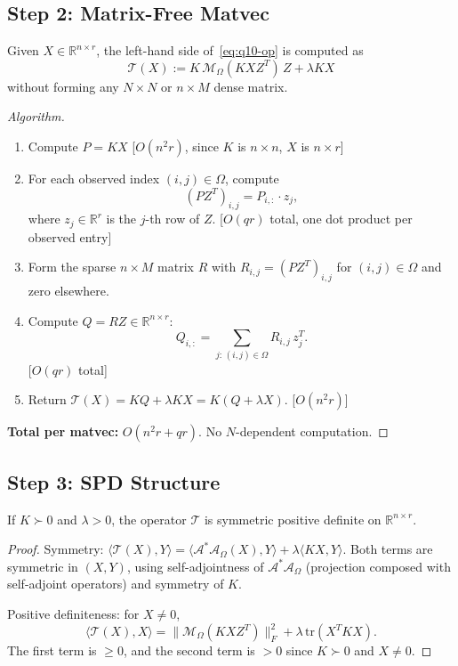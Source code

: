 \subsection*{Step 2: Matrix-Free Matvec}

\begin{proposition}\label{prop:q10-matvec}
Given $X\in\mathbb R^{n\times r}$, the left-hand side of~\eqref{eq:q10-op} is computed as
\[
\mathcal T(X) := K\,\mathcal M_\Omega(K X Z^T)\,Z + \lambda K X
\]
without forming any $N\times N$ or $n\times M$ dense matrix.
\end{proposition}

\begin{proof}[Algorithm]
\leavevmode
\begin{enumerate}
\item Compute $P = KX$ \hfill [$O(n^2 r)$, since $K$ is $n\times n$, $X$ is $n\times r$]
\item For each observed index $(i,j)\in\Omega$, compute
\[
(PZ^T)_{i,j} = P_{i,:}\cdot z_j,
\]
where $z_j\in\mathbb R^r$ is the $j$-th row of $Z$.
\hfill [$O(qr)$ total, one dot product per observed entry]
\item Form the sparse $n\times M$ matrix $R$ with $R_{i,j}=(PZ^T)_{i,j}$ for $(i,j)\in\Omega$ and zero elsewhere.
\item Compute $Q = RZ\in\mathbb R^{n\times r}$:
\[
Q_{i,:} = \sum_{j:\,(i,j)\in\Omega} R_{i,j}\,z_j^T.
\]
\hfill [$O(qr)$ total]
\item Return $\mathcal T(X) = KQ + \lambda KX = K(Q + \lambda X)$.
\hfill [$O(n^2 r)$]
\end{enumerate}
\textbf{Total per matvec:} $O(n^2 r + qr)$. No $N$-dependent computation.
\end{proof}

\subsection*{Step 3: SPD Structure}

\begin{proposition}\label{prop:q10-spd}
If $K\succ 0$ and $\lambda>0$, the operator $\mathcal T$ is symmetric positive definite on $\mathbb R^{n\times r}$.
\end{proposition}

\begin{proof}
Symmetry: $\langle \mathcal T(X),Y\rangle = \langle \mathcal A^*\mathcal A_\Omega(X),Y\rangle + \lambda\langle KX,Y\rangle$. Both terms are symmetric in $(X,Y)$, using self-adjointness of $\mathcal A^*\mathcal A_\Omega$ (projection composed with self-adjoint operators) and symmetry of $K$.

Positive definiteness: for $X\ne 0$,
\[
\langle \mathcal T(X),X\rangle
= \|\mathcal M_\Omega(KXZ^T)\|_F^2 + \lambda\,\mathrm{tr}(X^T K X).
\]
The first term is $\ge 0$, and the second term is $>0$ since $K\succ 0$ and $X\ne 0$.
\end{proof}

